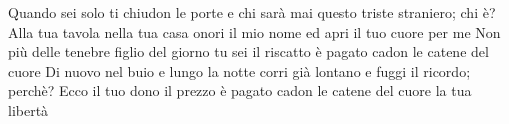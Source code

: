 \beginverse
Quando sei solo
ti chiudon le porte
e chi sarà mai
questo triste straniero; chi è?
Alla tua tavola
nella tua casa
onori il mio nome
ed apri il tuo cuore per me
\endverse
\beginchorus
Non più delle tenebre
figlio del giorno tu sei
il riscatto è pagato
cadon le catene del cuore
\endchorus
\beginverse
Di nuovo nel buio
e lungo la notte
corri già lontano
e fuggi il ricordo; perchè?
Ecco il tuo dono
il prezzo è pagato
cadon le catene del cuore
la tua libertà
\endverse
\endsong
